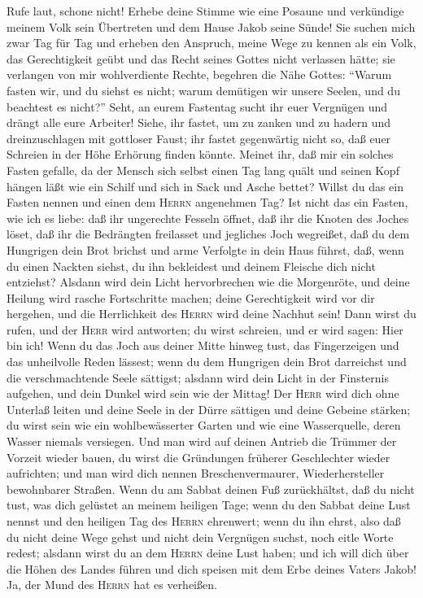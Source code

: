  Rufe laut, schone nicht! Erhebe deine Stimme wie eine
Posaune und verkündige meinem Volk sein Übertreten und dem Hause Jakob
seine Sünde!  Sie suchen mich zwar Tag für Tag und erheben
den Anspruch, meine Wege zu kennen als ein Volk, das Gerechtigkeit geübt
und das Recht seines Gottes nicht verlassen hätte; sie verlangen von mir
wohlverdiente Rechte, begehren die Nähe Gottes:  ``Warum
fasten wir, und du siehst es nicht; warum demütigen wir unsere Seelen,
und du beachtest es nicht?'' Seht, an eurem Fastentag sucht ihr euer
Vergnügen und drängt alle eure Arbeiter!  Siehe, ihr
fastet, um zu zanken und zu hadern und dreinzuschlagen mit gottloser
Faust; ihr fastet gegenwärtig nicht so, daß euer Schreien in der Höhe
Erhörung finden könnte.  Meinet ihr, daß mir ein solches
Fasten gefalle, da der Mensch sich selbst einen Tag lang quält und
seinen Kopf hängen läßt wie ein Schilf und sich in Sack und Asche
bettet? Willst du das ein Fasten nennen und einen dem \textsc{Herrn}
angenehmen Tag?  Ist nicht das ein Fasten, wie ich es
liebe: daß ihr ungerechte Fesseln öffnet, daß ihr die Knoten des Joches
löset, daß ihr die Bedrängten freilasset und jegliches Joch wegreißet,
 daß du dem Hungrigen dein Brot brichst und arme Verfolgte
in dein Haus führst, daß, wenn du einen Nackten siehst, du ihn
bekleidest und deinem Fleische dich nicht entziehst? 
Alsdann wird dein Licht hervorbrechen wie die Morgenröte, und deine
Heilung wird rasche Fortschritte machen; deine Gerechtigkeit wird vor
dir hergehen, und die Herrlichkeit des \textsc{Herrn} wird deine Nachhut
sein!  Dann wirst du rufen, und der \textsc{Herr} wird
antworten; du wirst schreien, und er wird sagen: Hier bin ich! Wenn du
das Joch aus deiner Mitte hinweg tust, das Fingerzeigen und das
unheilvolle Reden lässest;  wenn du dem Hungrigen dein
Brot darreichst und die verschmachtende Seele sättigst; alsdann wird
dein Licht in der Finsternis aufgehen, und dein Dunkel wird sein wie der
Mittag!  Der \textsc{Herr} wird dich ohne Unterlaß leiten
und deine Seele in der Dürre sättigen und deine Gebeine stärken; du
wirst sein wie ein wohlbewässerter Garten und wie eine Wasserquelle,
deren Wasser niemals versiegen.  Und man wird auf deinen
Antrieb die Trümmer der Vorzeit wieder bauen, du wirst die Gründungen
früherer Geschlechter wieder aufrichten; und man wird dich nennen
Breschenvermaurer, Wiederhersteller bewohnbarer Straßen. 
Wenn du am Sabbat deinen Fuß zurückhältst, daß du nicht tust, was dich
gelüstet an meinem heiligen Tage; wenn du den Sabbat deine Lust nennst
und den heiligen Tag des \textsc{Herrn} ehrenwert; wenn du ihn ehrst,
also daß du nicht deine Wege gehst und nicht dein Vergnügen suchst, noch
eitle Worte redest;  alsdann wirst du an dem
\textsc{Herrn} deine Lust haben; und ich will dich über die Höhen des
Landes führen und dich speisen mit dem Erbe deines Vaters Jakob! Ja, der
Mund des \textsc{Herrn} hat es verheißen.

